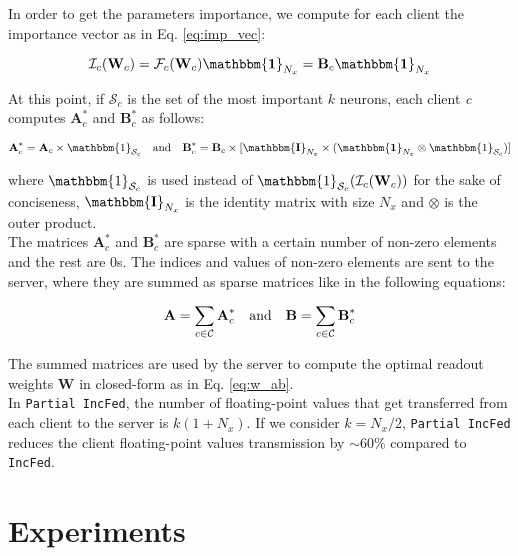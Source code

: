 In order to get the parameters importance, we compute for each client the importance vector as in Eq. \ref{eq:imp_vec}:

\begin{equation}
    \mathcal{I}_c(\textbf{W}_c)=\mathcal{F}_c(\textbf{W}_c)\mathbbm{\bf 1}_{N_x}=\textbf{B}_c\mathbbm{\bf 1}_{N_x}
\end{equation}

At this point, if $\mathcal{S}_c$ is the set of the most important $k$ neurons, each client \textit{c} computes $\textbf{A}_c^*$ and $\textbf{B}_c^*$ as follows:

\begin{equation}\label{eq:ab_select}
    \textbf{A}_c^*=\textbf{A}_c\times\mathbbm{1}_{\mathcal{S}_c}\text{\quad and\quad}\textbf{B}_c^*=\textbf{B}_c\times[\mathbbm{\bf I}_{N_x}\times(\mathbbm{\bf 1}_{N_x}\otimes\mathbbm{1}_{\mathcal{S}_c})]
\end{equation}

where $\mathbbm{1}_{\mathcal{S}_c}$ is used instead of $\mathbbm{1}_{\mathcal{S}_c}(\mathcal{I}_c(\textbf{W}_c))$ for the
sake of conciseness, $\mathbbm{\bf I}_{N_x}$ is the identity matrix with size $N_x$ and $\otimes$ is the outer product.\\

The matrices $\textbf{A}_c^*$ and $\textbf{B}_c^*$ are sparse with a certain number of non-zero elements and the rest are 0s. The indices and values of non-zero elements are sent to the server, where they are summed as sparse matrices like in the following equations:

\begin{equation}
    \textbf{A}=\sum_{c\in\mathcal{C}}\textbf{A}_c^*\text{\quad and\quad}\textbf{B}=\sum_{c\in\mathcal{C}}\textbf{B}_c^*
\end{equation}

The summed matrices are used by the server to compute the optimal readout weights $\textbf{W}$ in closed-form as in Eq. \ref{eq:w_ab}.\\

In \texttt{Partial IncFed}, the number of floating-point values that get transferred from each client to the server is $k(1+N_x)$. If we consider $k=N_x/2$, \texttt{Partial IncFed} reduces the client floating-point values transmission by $\sim60\%$ compared to \texttt{IncFed}.

\section{Experiments}

